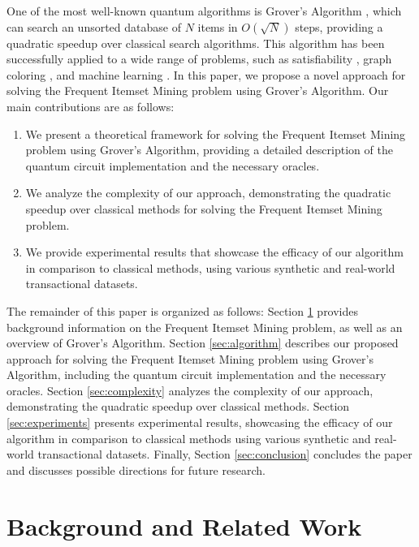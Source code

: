 One of the most well-known quantum algorithms is Grover's Algorithm \cite{grover1996fast}, which can search an unsorted database of $N$ items in $O(\sqrt{N})$ steps, providing a quadratic speedup over classical search algorithms. This algorithm has been successfully applied to a wide range of problems, such as satisfiability \cite{cerf1998grover}, graph coloring \cite{zalka1999efficient}, and machine learning \cite{wiebe2012quantum}. In this paper, we propose a novel approach for solving the Frequent Itemset Mining problem using Grover's Algorithm. Our main contributions are as follows:

\begin{enumerate}
    \item We present a theoretical framework for solving the Frequent Itemset Mining problem using Grover's Algorithm, providing a detailed description of the quantum circuit implementation and the necessary oracles.
    \item We analyze the complexity of our approach, demonstrating the quadratic speedup over classical methods for solving the Frequent Itemset Mining problem.
    \item We provide experimental results that showcase the efficacy of our algorithm in comparison to classical methods, using various synthetic and real-world transactional datasets.
\end{enumerate}

The remainder of this paper is organized as follows: Section \ref{sec:background} provides background information on the Frequent Itemset Mining problem, as well as an overview of Grover's Algorithm. Section \ref{sec:algorithm} describes our proposed approach for solving the Frequent Itemset Mining problem using Grover's Algorithm, including the quantum circuit implementation and the necessary oracles. Section \ref{sec:complexity} analyzes the complexity of our approach, demonstrating the quadratic speedup over classical methods. Section \ref{sec:experiments} presents experimental results, showcasing the efficacy of our algorithm in comparison to classical methods using various synthetic and real-world transactional datasets. Finally, Section \ref{sec:conclusion} concludes the paper and discusses possible directions for future research.

\section{Background and Related Work}
\label{sec:background}

